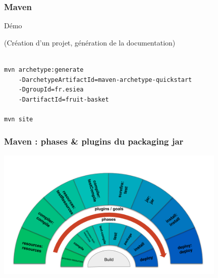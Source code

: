 \begin{frame}[fragile]
	\frametitle{Maven}
    \begin{center}
    \fontsize{48pt}{7.2}\selectfont
    D\'{e}mo
    \end{center}
    \begin{center}
    (Cr\'{e}ation d'un projet, g\'{e}n\'{e}ration de la documentation)
    \\~\\
    \begin{lstlisting}
mvn archetype:generate
	-DarchetypeArtifactId=maven-archetype-quickstart
    -DgroupId=fr.esiea
    -DartifactId=fruit-basket

mvn site
		\end{lstlisting} 
    \end{center}
\end{frame}

\begin{frame}
	\frametitle{Maven : phases \& plugins du packaging jar}
    \includegraphics[width=11cm]{img/maven_circle.png}
\end{frame}

